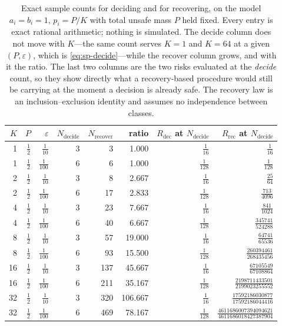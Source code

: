 \begin{table}[t]
\caption{Exact sample counts for deciding and for recovering, on the model
$a_{i}=b_{i}=1$, $p_{i}=P/K$ with total unsafe mass $P$ held fixed. Every entry is exact
rational arithmetic; nothing is simulated. The decide column does not move with $K$---the
same count serves $K=1$ and $K=64$ at a given $(P,\varepsilon)$, which is
\eqref{eq:sp-decide}---while the recover column grows, and with it the ratio. The last two
columns are the two risks evaluated at the \emph{decide} count, so they show directly what a
recovery-based procedure would still be carrying at the moment a decision is already safe.
The recovery law is an inclusion--exclusion identity and assumes no independence between
classes.}
\label{tab:sp-separation}
\centering
\footnotesize
\setlength{\tabcolsep}{6pt}
\begin{tabular}{@{}rrrrrrrr@{}}
\toprule
$K$ & $P$ & $\varepsilon$ & $N_{\mathrm{decide}}$ & $N_{\mathrm{recover}}$ &
ratio & $R_{\mathrm{dec}}$ at $N_{\mathrm{decide}}$ & $R_{\mathrm{rec}}$ at $N_{\mathrm{decide}}$ \\
\midrule
1 & $\frac{1}{2}$ & $\frac{1}{10}$ & 3 & 3 & 1.000 & $\frac{1}{16}$ & $\frac{1}{16}$ \\
1 & $\frac{1}{2}$ & $\frac{1}{100}$ & 6 & 6 & 1.000 & $\frac{1}{128}$ & $\frac{1}{128}$ \\
2 & $\frac{1}{2}$ & $\frac{1}{10}$ & 3 & 8 & 2.667 & $\frac{1}{16}$ & $\frac{25}{64}$ \\
2 & $\frac{1}{2}$ & $\frac{1}{100}$ & 6 & 17 & 2.833 & $\frac{1}{128}$ & $\frac{713}{4096}$ \\
4 & $\frac{1}{2}$ & $\frac{1}{10}$ & 3 & 23 & 7.667 & $\frac{1}{16}$ & $\frac{841}{1024}$ \\
4 & $\frac{1}{2}$ & $\frac{1}{100}$ & 6 & 40 & 6.667 & $\frac{1}{128}$ & $\frac{345741}{524288}$ \\
8 & $\frac{1}{2}$ & $\frac{1}{10}$ & 3 & 57 & 19.000 & $\frac{1}{16}$ & $\frac{64741}{65536}$ \\
8 & $\frac{1}{2}$ & $\frac{1}{100}$ & 6 & 93 & 15.500 & $\frac{1}{128}$ & $\frac{260394461}{268435456}$ \\
16 & $\frac{1}{2}$ & $\frac{1}{10}$ & 3 & 137 & 45.667 & $\frac{1}{16}$ & $\frac{67105549}{67108864}$ \\
16 & $\frac{1}{2}$ & $\frac{1}{100}$ & 6 & 211 & 35.167 & $\frac{1}{128}$ & $\frac{2198711433501}{2199023255552}$ \\
32 & $\frac{1}{2}$ & $\frac{1}{10}$ & 3 & 320 & 106.667 & $\frac{1}{16}$ & $\frac{17592186030877}{17592186044416}$ \\
32 & $\frac{1}{2}$ & $\frac{1}{100}$ & 6 & 469 & 78.167 & $\frac{1}{128}$ & $\frac{4611686007394094621}{4611686018427387904}$ \\
\bottomrule
\end{tabular}
\end{table}


